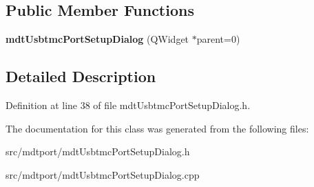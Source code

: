 \subsection*{Public Member Functions}
\begin{DoxyCompactItemize}
\item 
\hypertarget{classmdt_usbtmc_port_setup_dialog_afdfb9303c8c2a1c9da8ecb19d5c19610}{
{\bfseries mdtUsbtmcPortSetupDialog} (QWidget $\ast$parent=0)}
\label{classmdt_usbtmc_port_setup_dialog_afdfb9303c8c2a1c9da8ecb19d5c19610}

\end{DoxyCompactItemize}


\subsection{Detailed Description}


Definition at line 38 of file mdtUsbtmcPortSetupDialog.h.



The documentation for this class was generated from the following files:\begin{DoxyCompactItemize}
\item 
src/mdtport/mdtUsbtmcPortSetupDialog.h\item 
src/mdtport/mdtUsbtmcPortSetupDialog.cpp\end{DoxyCompactItemize}
